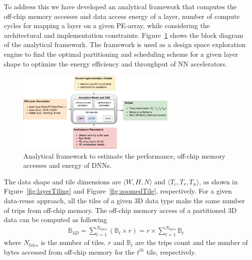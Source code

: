 \documentclass[a4paper,10pt]{article}
\newcommand{\numBytesOffChip}{\mathbb{B}}
\begin{document}
To address this we have developed an analytical framework that computes the off-chip memory accesses and data access energy of a layer, number of compute cycles for mapping a layer on a given PE-array, while considering the architectural and implementation constraints. Figure~\ref{fig:analyticalModel} shows the block diagram of the analytical framework. The framework is used as a design space exploration engine to find the optimal partitioning and scheduling scheme for a given layer shape to optimize the energy efficiency and throughput of NN accelerators. 
\begin{figure}[!htb]
	\centering
	\includegraphics[width=0.7\textwidth]{analyticalModel}
	\caption{Analytical framework to estimate the performance, off-chip memory accesses and energy of DNNs.}
	\label{fig:analyticalModel}
\end{figure}
The data shape and tile dimensions are $\langle W,H,N\rangle$ and $\langle T_c,T_r,T_n\rangle$, as shown in Figure~\ref{fig:layerTiling} and Figure~\ref{fig:zoomedTile}, respectively. For a given data-reuse approach, all the tiles of a given 3D data type make the same number of trips from off-chip memory. The off-chip memory access of a partitioned 3D data can be computed as following
\begin{align}\label{eq:BasicOffChip3DDataAccess}
	\numBytesOffChip_{3D}{=}\sum_{t=1}^{N_{tiles}}(\numBytesOffChip_{t}{\times}r){=}r{\times} \sum_{t=1}^{N_{tiles}}{\numBytesOffChip_{t}}
\end{align}
where $N_{tiles}$ is the number of tiles. $r$ and $\numBytesOffChip_{t}$ are the trips count and the number of bytes accessed from off-chip memory for the $t^{th}$ tile, respectively. 
\end{document}
